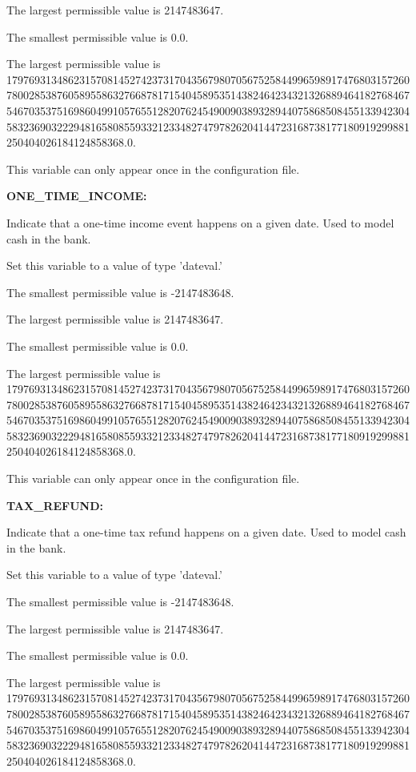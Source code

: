 The largest permissible value is 2147483647.

The smallest permissible value is 0.0.

The largest permissible value is 179769313486231570814527423731704356798070567525844996598917476803157260780028538760589558632766878171540458953514382464234321326889464182768467546703537516986049910576551282076245490090389328944075868508455133942304583236903222948165808559332123348274797826204144723168738177180919299881250404026184124858368.0.

This variable can only appear once in the configuration file.


\textbf{ONE\_TIME\_INCOME:}


Indicate that a one-time income event happens on a given date.  Used to model cash in the bank.

Set this variable to a value of type 'dateval.'

The smallest permissible value is -2147483648.

The largest permissible value is 2147483647.

The smallest permissible value is 0.0.

The largest permissible value is 179769313486231570814527423731704356798070567525844996598917476803157260780028538760589558632766878171540458953514382464234321326889464182768467546703537516986049910576551282076245490090389328944075868508455133942304583236903222948165808559332123348274797826204144723168738177180919299881250404026184124858368.0.

This variable can only appear once in the configuration file.


\textbf{TAX\_REFUND:}


Indicate that a one-time tax refund happens on a given date.  Used to model cash in the bank.

Set this variable to a value of type 'dateval.'

The smallest permissible value is -2147483648.

The largest permissible value is 2147483647.

The smallest permissible value is 0.0.

The largest permissible value is 179769313486231570814527423731704356798070567525844996598917476803157260780028538760589558632766878171540458953514382464234321326889464182768467546703537516986049910576551282076245490090389328944075868508455133942304583236903222948165808559332123348274797826204144723168738177180919299881250404026184124858368.0.

